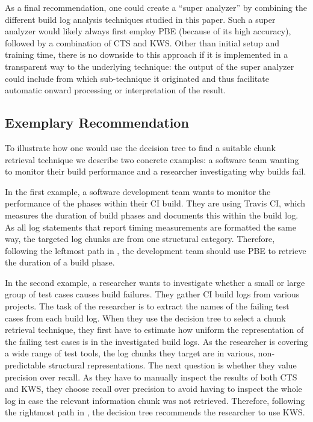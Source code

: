 As a final recommendation, one could create a ``super analyzer'' by
combining the different build log analysis techniques studied in this
paper.
Such a super analyzer would likely always first employ PBE
(because of its high accuracy), followed by a combination of CTS and
KWS\@.
Other than initial setup and training time, there is no
downside to this approach if it is implemented in a transparent way to
the underlying technique: the output of the super analyzer could
include from which sub-technique it originated and thus facilitate
automatic onward processing or interpretation of the result.


\subsection{Exemplary Recommendation}
To illustrate how one would use the decision tree to find a suitable
chunk retrieval technique we describe two concrete examples: a software
team
wanting to monitor their build performance and a
researcher investigating why builds fail.

In the first example, a software development team wants to monitor
the performance of the phases within their CI build.
They are using
Travis CI, which measures the duration of build phases and documents
this within the build log.
As all log statements that report timing
measurements are formatted the same way, the targeted log chunks are
from one structural category.
Therefore, following the leftmost path in
,
the development team should use
PBE to retrieve the duration of a build phase.

In the second example, a researcher wants to investigate whether a small
or large group of test cases
causes build failures.
They gather
CI build logs from various projects.
The task of the researcher is to extract the names of the
failing test cases from each build log.
When they use the
decision tree to select a chunk retrieval technique, they
first have to estimate how uniform the representation of the failing
test cases is in the investigated build logs.
As the researcher is
covering a wide range of test tools, the
log chunks they target are in various, non-predictable structural
representations.
The next question is whether they value precision
over recall.
As they have to manually inspect the results of both CTS
and KWS, they choose recall over precision to avoid having to inspect
the whole log in case the relevant information chunk was not
retrieved.
Therefore, following the rightmost path in
,
the decision tree recommends the researcher to use KWS\@.

